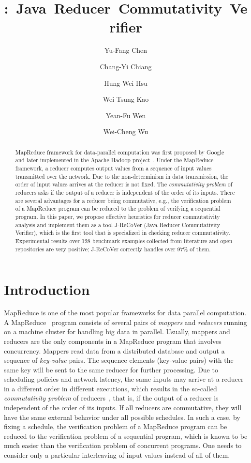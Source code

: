 \documentclass{llncs}
\title{\hspace{-0.1cm}{J-ReCoVer}:~Java~Reducer~Commutativity~Verifier}
\author{
Yu-Fang Chen\inst{1}\inst{2}
\and
Chang-Yi Chiang\inst{2}
\and
Hung-Wei Hsu\inst{1}
\and
Wei-Tsung Kao\inst{1}
\and
Yean-Fu Wen\inst{2}
\and
Wei-Cheng Wu\inst{1}
}
\institute
{
Institute of Information Science, Academia Sinica, Taiwan
\and
Graduate Institute of Information Management, National Taipei University, Taiwan
}
\begin{document}
\maketitle

\begin{abstract}

MapReduce framework for data-parallel computation was first proposed by Google~\cite{dean04} and later implemented in the Apache Hadoop project~\cite{hadoop}.
Under the MapReduce framework, a reducer computes output values from a sequence of input values transmitted over the network.  Due to the non-determinism in data transmission, the order of input values arrives at the reducer is not fixed.
The \emph{commutativity problem} of reducers asks if the output of a reducer is independent of the order of its inputs. There are several advantages for a reducer being commutative, e.g., the verification problem of a MapReduce program can be reduced to the problem of verifying a sequential program.
In this paper, we propose effective heuristics for reducer commutativity analysis and implement them as a tool J-ReCoVer (Java Reducer Commutativity Verifier), which is the first tool that is specialized in checking reducer commutativity. Experimental results over 128 benchmark examples collected from literature and open repositories are very positive; J-ReCoVer correctly handles over 97\% of them.

\end{abstract}

\section{Introduction}
\label{section:introduction}

MapReduce is one of the most popular frameworks for data parallel computation.
A MapReduce~\cite{dean04,hadoop} program consists of several pairs of \emph{mappers} and \emph{reducers} running on a machine cluster for handling big data in parallel. Usually, mappers and reducers are the only components in a MapReduce program that involves concurrency. Mappers read data from a distributed database and output a sequence of \emph{key-value} pairs. The sequence elements (key-value pairs) with the same key will be sent to the same reducer for further processing. Due to scheduling policies and network latency, the same inputs may arrive at a reducer in a different order in different executions, which results in the so-called \emph{commutativity problem} of reducers~\cite{csallner13testing,xiao14mr,ChenHSW15,ChenSW16}, that is, if the output of a reducer is independent of the order of its inputs.
If all reducers are commutative, they will have the same external behavior under all possible schedules. In such a case, by fixing a schedule, the verification problem of a MapReduce program can be reduced to the verification problem of a sequential program, which is known to be much easier than the verification problem of concurrent programs. One needs to consider only a particular interleaving of input values instead of all of them.
\end{document}
